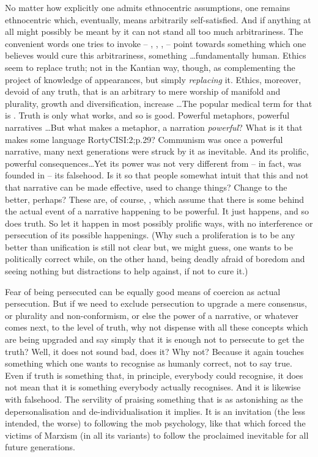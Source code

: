 \pa No matter how explicitly one admits
ethnocentric assumptions, one remains ethnocentric which, eventually, means
arbitrarily self-satisfied.  And if anything at all might possibly be meant by
 it can not stand all too much arbitrariness.  The convenient words
one tries to invoke -- , ,
,  -- point towards something which one believes would cure this
arbitrariness, something \ldots fundamentally human.  Ethics seem to replace
truth; not in the Kantian way, though, as complementing the project of knowledge
of appearances, but simply {\em replacing} it.  Ethics, moreover, devoid of any
truth, that is an arbitrary  to mere worship of manifold and
plurality, growth and diversification, increase \ldots The popular medical term
for that is .  Truth is only what works, and so is good.  Powerful
metaphors, powerful narratives \ldots But what makes a metaphor, a narration
{\em powerful}?  What is it that makes some language \citet{strike also the next
  generation as inevitable}{RortyCIS}{I:2;p.29}?  Communism was once a powerful
narrative, many next generations were struck by it as inevitable. And its
prolific, powerful 
consequences\ldots Yet its power was not very different from -- in fact, was
founded in -- its falsehood.  Is it so that people somewhat intuit that this and
not that narrative can be made effective, used to change things?  Change to the
better, perhaps?  These are, of course, , which assume that
there is some  behind the actual event of a narrative happening to be
powerful.  It just happens, and so does truth.  So let it happen in most
possibly prolific ways, with no interference or persecution of its possible
happenings.  (Why such a proliferation is to be any better than unification is
still not clear but, we might guess, one wants to be politically correct while,
on the other hand, being deadly afraid of boredom and seeing nothing but
distractions to help against, if not to cure it.)

Fear of being persecuted can be equally good means of coercion as actual
persecution.  But if we need to exclude persecution to upgrade a mere consensus,
or plurality and non-conformism, or else the power of a narrative, or whatever
comes next, to the level of truth, why not dispense with all these concepts
which are being upgraded and say simply that it is enough not to persecute to
get the truth?   Well, it does not sound bad,
does it?  Why not?  Because it again touches something which one wants to
recognise as humanly correct, not to say true. Even if truth is something that,
in principle, everybody could recognise, it does not mean that it is something
everybody actually recognises. And it is likewise with falsehood. The servility
of praising something that  is as astonishing as the depersonalisation and
de-individualisation it implies.  It is an invitation (the less intended, the
worse) to following the mob psychology, like that which forced the victims of
Marxism (in all its variants) to follow the  proclaimed
inevitable for all future generations.

